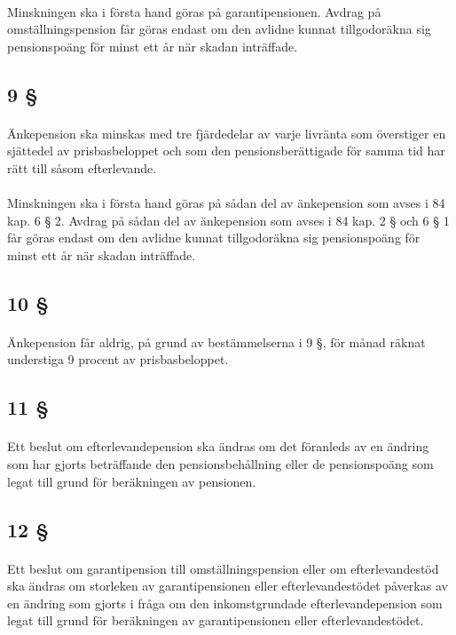 \documentclass[a4paper,notitlepage,openany,10pt]{book}
\begin{document}
\paragraph*{}
Minskningen ska i första hand göras på garantipensionen.
Avdrag på omställningspension får göras endast om den avlidne kunnat tillgodoräkna sig pensionspoäng för minst ett år när skadan inträffade.
\subsection*{9 §}
\paragraph*{}
Änkepension ska minskas med tre fjärdedelar av varje livränta som överstiger en sjättedel av prisbasbeloppet och som den pensionsberättigade för samma tid har rätt till såsom efterlevande.
\paragraph*{}
Minskningen ska i första hand göras på sådan del av änkepension som avses i 84 kap. 6 § 2. Avdrag på sådan del av änkepension som avses i 84 kap. 2 § och 6 § 1 får göras endast om den avlidne kunnat tillgodoräkna sig pensionspoäng för minst ett år när skadan inträffade.
\subsection*{10 §}
\paragraph*{}
Änkepension får aldrig, på grund av bestämmelserna i 9 §, för månad räknat understiga 9 procent av prisbasbeloppet.
\subsection*{11 §}
\paragraph*{}
Ett beslut om efterlevandepension ska ändras om det föranleds av en ändring som har gjorts beträffande den pensionsbehållning eller de pensionspoäng som legat till grund för beräkningen av pensionen.
\subsection*{12 §}
\paragraph*{}
Ett beslut om garantipension till omställningspension eller om efterlevandestöd ska ändras om storleken av garantipensionen eller efterlevandestödet påverkas av en ändring som gjorts i fråga om den inkomstgrundade efterlevandepension som legat till grund för beräkningen av garantipensionen eller efterlevandestödet.
\end{document}
